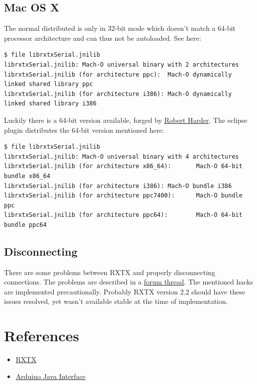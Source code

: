 \subsection{Mac OS X}
\label{source/driver:rxtx-wiki-entry}\label{source/driver:mac-os-x}
The normal distributed  is only in 32-bit mode which doesn't match a 64-bit processor architecture and can thus not be autoloaded. See here:

\begin{verbatim}
$ file librxtxSerial.jnilib
librxtxSerial.jnilib: Mach-O universal binary with 2 architectures
librxtxSerial.jnilib (for architecture ppc):  Mach-O dynamically linked shared library ppc
librxtxSerial.jnilib (for architecture i386): Mach-O dynamically linked shared library i386
\end{verbatim}

Luckily there is a 64-bit version available, forged by \href{http://blog.iharder.net/2009/08/18/rxtx-java-6-and-librxtxserial-jnilib-on-intel-mac-os-x/}{Robert Harder}. The eclipse plugin distributes the 64-bit version mentioned here:

\begin{verbatim}
$ file librxtxSerial.jnilib
librxtxSerial.jnilib: Mach-O universal binary with 4 architectures
librxtxSerial.jnilib (for architecture x86_64):       Mach-O 64-bit bundle x86_64
librxtxSerial.jnilib (for architecture i386): Mach-O bundle i386
librxtxSerial.jnilib (for architecture ppc7400):      Mach-O bundle ppc
librxtxSerial.jnilib (for architecture ppc64):        Mach-O 64-bit bundle ppc64
\end{verbatim}


\subsection{Disconnecting}
\label{source/driver:robert-harder}\label{source/driver:disconnecting}
There are some problems between RXTX and properly disconnecting connections. The problems are described in a \href{http://archive.infiniteautomation.com/forum/posts/list/297.page}{forum thread}. The mentioned hacks are implemented precautionally. Probably RXTX version 2.2 should have these issues resolved, yet wasn't available stable at the time of implementation.


\section{References}
\label{source/driver:forum-thread}\label{source/driver:references}\begin{itemize}
\item {}
\href{http://rxtx.qbang.org}{RXTX}

\item {}
\href{http://playground.arduino.cc/Interfacing/Java}{Arduino Java Interface}

\end{itemize}


